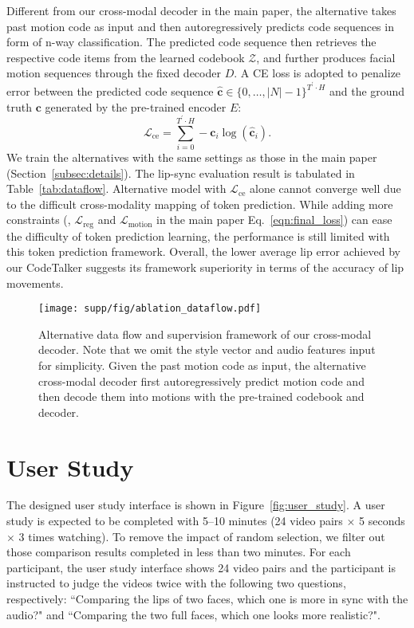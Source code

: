 Different from our cross-modal decoder in the main paper, the alternative takes past motion code as input and then autoregressively predicts code sequences in form of n-way classification. The predicted code sequence then retrieves the respective code items from the learned codebook $\mathcal{Z}$, and further produces facial motion sequences through the fixed decoder $D$. A CE loss is adopted to penalize error between the predicted code sequence $\hat{\mathbf{c}}\in \{0,\dots,|N|-1\}^{T^\prime \cdot H}$ and the ground truth $\mathbf{c}$ generated by the pre-trained encoder $E$:
\begin{equation}
    \mathcal{L}_\text{ce}=\sum_{i=0}^{T^\prime \cdot H}-\mathbf{c}_i\log(\hat{\mathbf{c}}_i).
\end{equation}
We train the alternatives with the same settings as those in the main paper (Section~\ref{subsec:details}). The lip-sync evaluation result is tabulated in Table~\ref{tab:dataflow}. Alternative model with $\mathcal{L}_\text{ce}$ alone cannot converge well due to the difficult cross-modality mapping of token prediction. While adding more constraints (\ie, $\mathcal{L}_\text{reg}$ and $\mathcal{L}_\text{motion}$ in the main paper Eq.~\ref{eqn:final_loss}) can ease the difficulty of token prediction learning, the performance is still limited with this token prediction framework. Overall, the lower average lip error achieved by our CodeTalker suggests its framework superiority in terms of the accuracy of lip movements.



\begin{figure}[!t]
    \centering
    \texttt{[image: supp/fig/ablation\_dataflow.pdf]}
    \caption{Alternative data flow and supervision framework of our cross-modal decoder. Note that we omit the style vector and audio features input for simplicity. Given the past motion code as input, the alternative cross-modal decoder first autoregressively predict motion code and then decode them into motions with the pre-trained codebook and decoder.}
    \label{fig:ablation_dataflow}
\end{figure}



\section{User Study}
\label{sec:user}
The designed user study interface is shown in Figure~\ref{fig:user_study}. A user study is expected to be completed with 5--10 minutes (24 video pairs $\times$ 5 seconds $\times$ 3 times watching). To remove the impact of random selection, we filter out those comparison results completed in less than two minutes. For each participant, the user study interface shows 24 video pairs and the participant is instructed to judge the videos twice with the following two questions, respectively: ``Comparing the lips of two faces, which one is more in sync with the audio?" and ``Comparing the two full faces, which one looks more realistic?".

